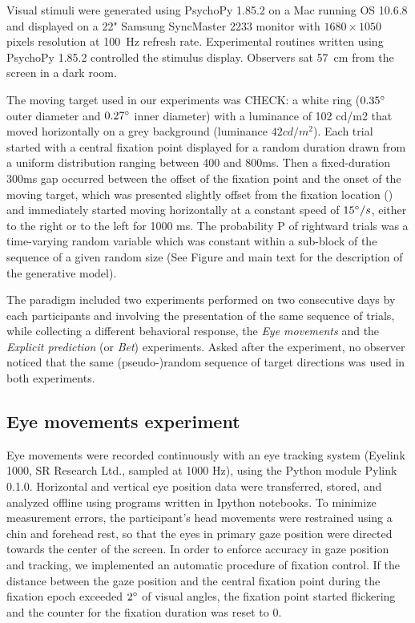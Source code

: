 \documentclass[12pt,english]{article}%
\newcommand{\citet}[1]{\textcite{#1}}
\begin{document}
Visual stimuli were generated using PsychoPy 1.85.2 on a Mac running OS 10.6.8 and displayed on a 22" Samsung SyncMaster 2233 monitor with $1680\times 1050$ pixels resolution at 100~\si{\Hz} refresh rate. Experimental routines written using PsychoPy 1.85.2 controlled the stimulus display. Observers sat 57~\si{\cm} from the screen in a dark room. 

The moving target used in our experiments was CHECK: a white ring ($0.35\degree$ outer diameter and $0.27\degree$ inner diameter) with a luminance of 102 cd/m2 that moved horizontally on a grey background (luminance $42cd/m^2$). Each trial started with a central fixation point displayed for a random duration drawn from a uniform distribution ranging between 400 and 800ms. Then a fixed-duration 300ms gap occurred between the offset of the fixation point and the onset of the moving target, which was presented slightly offset from the fixation location (\citet{Rashbass1961}) and immediately started moving horizontally at a constant speed of $15\degree/s$, either to the right or to the left for 1000 ms. The probability P of rightward trials was a time-varying random variable which was constant within a sub-block of the sequence of a given random size (See Figure  and main text for the description of the generative model). 

The paradigm included two experiments performed on two consecutive days by each participants and involving the presentation of the same sequence of trials, while collecting a different behavioral response, the \textit{Eye movements} and the \textit{Explicit prediction} (or \textit{Bet}) experiments. Asked after the experiment, no observer noticed that the same (pseudo-)random sequence of target directions was used in both experiments.

\subsection{Eye movements experiment}
Eye movements were recorded continuously with an eye tracking system (Eyelink 1000, SR Research Ltd., sampled at 1000 Hz), using the Python module Pylink 0.1.0. Horizontal and vertical eye position data were transferred, stored, and analyzed offline using programs written in Ipython notebooks.
To minimize measurement errors, the participant's head movements were restrained using a chin and forehead rest, so that the eyes in primary gaze position were directed towards the center of the screen. In order to enforce accuracy in gaze position and tracking, we implemented an automatic procedure of fixation control. If the distance between the gaze position and the central fixation point during the fixation epoch exceeded $2\degree$ of visual angles, the fixation point started flickering and the counter for the fixation duration was reset to $0$. 
\end{document}
